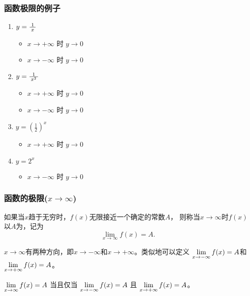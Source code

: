 \documentclass[14pt,notheorems,leqno,xcolor={rgb}]{beamer} %
\begin{document}
\begin{frame}
\frametitle{函数极限的例子}
\begin{enumerate}[<+->]
  \item $y=\wfrac1x$
  \begin{itemize}
    \item $x\to+\infty$ 时 $y\to0$
    \item $x\to-\infty$ 时 $y\to0$
  \end{itemize}
  \item $y=\wfrac1{x^2}$
  \begin{itemize}
    \item $x\to+\infty$ 时 $y\to0$
    \item $x\to-\infty$ 时 $y\to0$
  \end{itemize}
  \item $y=\left(\frac12\right)^x$
  \begin{itemize}
    \item $x\to+\infty$ 时 $y\to0$
  \end{itemize}
  \item $y=2^x$
  \begin{itemize}
    \item $x\to-\infty$ 时 $y\to0$
  \end{itemize}
\end{enumerate}
\end{frame}

\begin{oframe}
\frametitle{函数的极限($x\to\infty$)}
\begin{definition*}
如果当$x$趋于无穷时，$f(x)$无限接近一个确定的常数$A$，
则称当$x\to\infty$时$f(x)$以$A$为，记为
\[ \lim_{x\to\infty}f(x)=A. \]
\end{definition*}
\vpause
\begin{remark*}
$x\to\infty$有两种方向，即$x\to-\infty$和$x\to+\infty$。类似地可以定义
$\lim\limits_{x\to-\infty}f(x)=A$和$\lim\limits_{x\to+\infty}f(x)=A$。
\end{remark*}
\vpause
\begin{property*}
$\lim\limits_{x\to\infty}f(x)=A$ 当且仅当 $\lim\limits_{x\to-\infty}f(x)=A$ 且 $\lim\limits_{x\to+\infty}f(x)=A$。
\end{property*}
\end{oframe}
\end{document}

